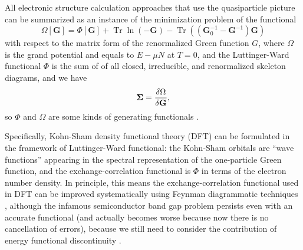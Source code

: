 \documentclass[hyperref, a4paper]{article}
\begin{document}
All electronic structure calculation approaches that use the quasiparticle picture 
can be summarized as an instance of the minimization problem 
of the functional 
\begin{equation}
    \Omega[\mathbf{G}]= \Phi[\mathbf{G}]+\operatorname{Tr} \ln (-\mathbf{G})-\operatorname{Tr}\left(\left(\mathbf{G}_0^{-1}-\mathbf{G}^{-1}\right) \mathbf{G}\right)
\end{equation}
with respect to the matrix form of the renormalized Green function $G$,
where $\Omega$ is the grand potential
and equals to $E - \mu N$ at $T = 0$, 
and the Luttinger-Ward functional $\Phi$ 
is the sum of of all closed, irreducible, and renormalized skeleton diagrams,
and we have 
\begin{equation}
    \mathbf{\Sigma} = \fdv{\Omega}{\mathbf{G}}, 
\end{equation}
so $\Phi$ and $\Omega$ are some kinds of generating functionals
\cite{PhysRev.118.1417,potthoff2003self}.

Specifically, Kohn-Sham density functional theory (DFT) 
can be formulated in the framework of Luttinger-Ward functional: 
the Kohn-Sham orbitals are ``wave functions'' 
appearing in the spectral representation of the one-particle Green function,
and the exchange-correlation functional 
is $\Phi$ in terms of the electron number density.
In principle, 
this means the exchange-correlation functional used in DFT
can be improved systematically using Feynman diagrammatic techniques
\cite{aryasetiawan2002total,gruning2006density,haule2015free},
although the infamous semiconductor band gap problem
persists even with an accurate functional
(and actually becomes worse because now there is no cancellation of errors),
because we still need to consider the contribution of 
energy functional discontinuity
\cite{gruning2006density}.
\end{document}
